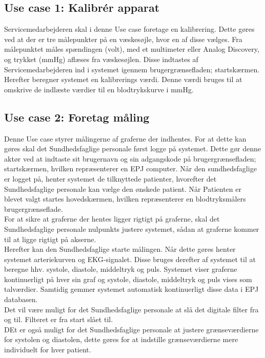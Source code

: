 \subsection{Use case 1: Kalibrér apparat}
Servicemedarbejderen skal i denne Use case foretage en kalibrering. Dette gøres ved at der er tre målepunkter på en væskesøjle, hvor en af disse vælges. Fra målepunktet måles spændingen (volt), med et multimeter eller Analog Discovery, og trykket (mmHg) aflæses fra væskesøjlen. Disse indtastes af Servicemedarbejderen ind i systemet igennem brugergrænsefladen; startskærmen. Herefter beregner systemet en kalibrerings værdi. Denne værdi bruges til at omskrive de indlæste værdier til en blodtrykskurve i mmHg.
\subsection{Use case 2: Foretag måling}
Denne Use case styrer målingerne af graferne der indhentes. For at dette kan gøres skal det Sundhedsfaglige personale først logge på systemet. Dette gør denne aktør ved at indtaste sit brugernavn og sin adgangskode på brugergrænsefladen; startskærmen, hvilken repræsenterer en EPJ computer. Når den sundhedsfaglige er logget på, henter systemet de tilknyttede patienter, hvorefter det Sundhedsfaglige personale kan vælge den ønskede patient. Når Patienten er blevet valgt startes hovedskærmen, hvilken repræsenterer en blodtryksmålers brugergrænseflade. \\
For at sikre at graferne der hentes ligger rigtigt på graferne, skal det Sundhedsfaglige personale nulpunkts justere systemet, sådan at graferne kommer til at ligge rigtigt på akserne.\\
Herefter kan den Sundhedsfaglige starte målingen. Når dette gøres henter systemet arteriekurven og EKG-signalet. Disse bruges derefter af systemet til at beregne hhv. systole, diastole, middeltryk og puls. Systemet viser graferne kontinuerligt på hver sin graf og systole, diastole, middeltryk og puls vises som talværdier. Samtidig gemmer systemet automatisk kontinuerligt disse data i EPJ databasen. \\
Det vil være muligt for det Sundhedsfaglige personale at slå det digitale filter fra og til. Filteret er fra start slået til.\\
DEt er også muligt for det Sundhedsfaglige personale at justere grænseværdierne for systolen og diastolen, dette gøres for at indstille grænseværdierne mere individuelt for hver patient.

